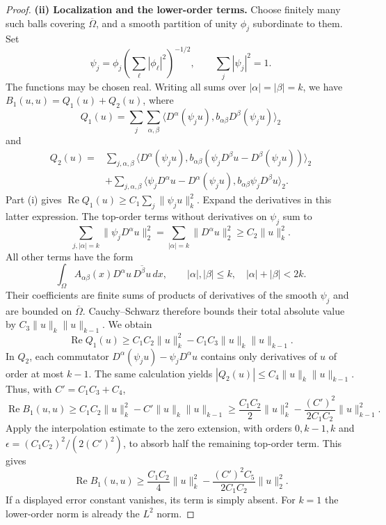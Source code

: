 \begin{proof}
\textbf{(ii) Localization and the lower-order terms.}
Choose finitely many such balls covering $\overline\Omega$, and a smooth
partition of unity $\phi_j$ subordinate to them. Set
\[
\psi_j=\phi_j\left(\sum_\ell|\phi_\ell|^2\right)^{-1/2},
\qquad \sum_j|\psi_j|^2=1.
\]
The functions may be chosen real. Writing all sums over
$|\alpha|=|\beta|=k$, we have $B_1(u,u)=Q_1(u)+Q_2(u)$, where
\[
Q_1(u)=\sum_j\sum_{\alpha,\beta}
 \langle D^\alpha(\psi_j u),b_{\alpha\beta}D^\beta(\psi_j u)\rangle_2
\]
and
\begin{align*}
Q_2(u)={}&\sum_{j,\alpha,\beta}
\langle D^\alpha(\psi_j u),
 b_{\alpha\beta}(\psi_jD^\beta u-D^\beta(\psi_j u))\rangle_2\\
&+\sum_{j,\alpha,\beta}
\langle\psi_jD^\alpha u-D^\alpha(\psi_j u),
 b_{\alpha\beta}\psi_jD^\beta u\rangle_2.
\end{align*}
Part (i) gives $\operatorname{Re}Q_1(u)\geq C_1\sum_j\|\psi_ju\|_k^2$.
Expand the derivatives in this latter expression. The top-order terms
without derivatives on $\psi_j$ sum to
\[
\sum_{j,|\alpha|=k}\|\psi_jD^\alpha u\|_2^2
=\sum_{|\alpha|=k}\|D^\alpha u\|_2^2\geq C_2\|u\|_k^2.
\]
All other terms have the form
\[
\int_\Omega A_{\alpha\beta}(x)D^\alpha u\,
\overline{D^\beta u}\,dx,
\qquad |\alpha|,|\beta|\leq k,\quad |\alpha|+|\beta|<2k.
\]
Their coefficients are finite sums of products of derivatives of the
smooth $\psi_j$ and are bounded on $\overline\Omega$.
Cauchy--Schwarz therefore bounds their total absolute value by
$C_3\|u\|_k\|u\|_{k-1}$. We obtain
\[
\operatorname{Re}Q_1(u)\geq C_1C_2\|u\|_k^2-C_1C_3\|u\|_k\|u\|_{k-1}.
\]
In $Q_2$, each commutator
$D^\alpha(\psi_ju)-\psi_jD^\alpha u$ contains only derivatives of $u$
of order at most $k-1$. The same calculation yields
$|Q_2(u)|\leq C_4\|u\|_k\|u\|_{k-1}$.
Thus, with $C'=C_1C_3+C_4$,
\[
\operatorname{Re}B_1(u,u)\geq C_1C_2\|u\|_k^2-C'\|u\|_k\|u\|_{k-1}
\geq\frac{C_1C_2}{2}\|u\|_k^2-
 \frac{(C')^2}{2C_1C_2}\|u\|_{k-1}^2.
\]
Apply the interpolation estimate to the zero extension, with orders
$0,k-1,k$ and $\epsilon=(C_1C_2)^2/(2(C')^2)$, to absorb half the
remaining top-order term. This gives
\[
\operatorname{Re}B_1(u,u)\geq\frac{C_1C_2}{4}\|u\|_k^2-
 \frac{(C')^2C_5}{2C_1C_2}\|u\|_2^2.
\]
If a displayed error constant vanishes, its term is simply absent.
For $k=1$ the lower-order norm is already the $L^2$ norm.
\end{proof}
